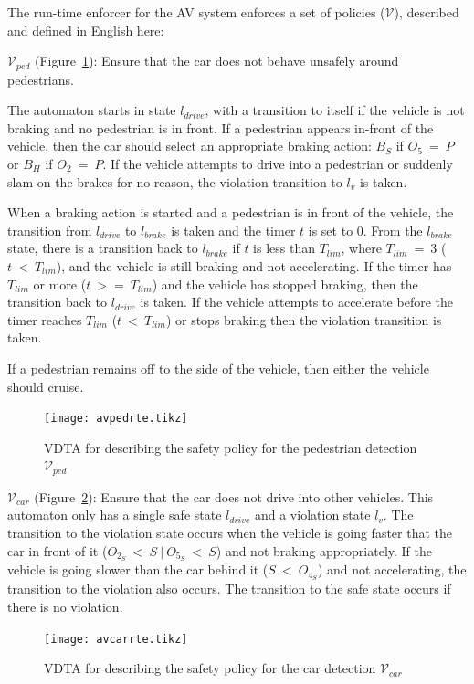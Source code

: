 The run-time enforcer for the \ac{AV} system enforces a set of policies ($\mathcal{V}$), described and defined in English here:

$\mathcal{V}_{ped}$ (Figure~\ref{fig:avpedrte}): Ensure that the car does not behave unsafely around pedestrians. 

The automaton starts in state $l_{drive}$, with a transition to itself if the vehicle is not braking and no pedestrian is in front.
If a pedestrian appears in-front of the vehicle, then the car should select an appropriate braking action: $B_S$ if $O_5~=~P$ or $B_H$ if $O_2~=~P$.
If the vehicle attempts to drive into a pedestrian or suddenly slam on the brakes for no reason, the violation transition to $l_v$ is taken.
 
When a braking action is started and a pedestrian is in front of the vehicle, the transition from $l_{drive}$ to $l_{brake}$ is taken and the timer $t$ is set to 0.
From the $l_{brake}$ state, there is a transition back to $l_{brake}$ if $t$ is less than $T_{lim}$, where $T_{lim}~=~3$ ($t~<~T_{lim}$), and the vehicle is still braking and not accelerating.
If the timer has $T_{lim}$ or more ($t~>=~T_{lim}$) and the vehicle has stopped braking, then the transition back to $l_{drive}$ is taken.
If the vehicle attempts to accelerate before the timer reaches $T_{lim}$ ($t~<~T_{lim}$) or stops braking then the violation transition is taken.

If a pedestrian remains off to the side of the vehicle, then either the vehicle should cruise.

\begin{figure}[h]
	\centering
	\texttt{[image: avpedrte.tikz]}
	\caption{\ac{VDTA} for describing the safety policy for the pedestrian detection $\mathcal{V}_{ped}$\label{fig:avpedrte}}
\end{figure}

$\mathcal{V}_{car}$ (Figure~\ref{fig:avcarrte}): Ensure that the car does not drive into other vehicles. 
This automaton only has a single safe state $l_{drive}$ and a violation state $l_v$.
The transition to the violation state occurs when the vehicle is going faster that the car in front of it ($O_{2_S}~<~S~|~O_{5_S}~<~S$) and not braking appropriately.
If the vehicle is going slower than the car behind it ($S~<~O_{4_S}$) and not accelerating, the transition to the violation also occurs.
The transition to the safe state occurs if there is no violation.

\begin{figure}[h]
	\centering
	\texttt{[image: avcarrte.tikz]}
	\caption{\ac{VDTA} for describing the safety policy for the car detection $\mathcal{V}_{car}$\label{fig:avcarrte}}
\end{figure}

